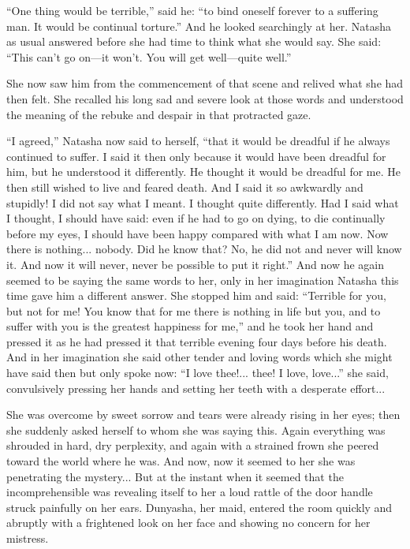 ``One thing would be terrible,'' said he: ``to bind oneself
forever to a suffering man. It would be continual torture.'' And
he looked searchingly at her. Natasha as usual answered before
she had time to think what she would say. She said: ``This can't
go on---it won't. You will get well---quite well.''

She now saw him from the commencement of that scene and relived
what she had then felt. She recalled his long sad and severe look
at those words and understood the meaning of the rebuke and
despair in that protracted gaze.

``I agreed,'' Natasha now said to herself, ``that it would be
dreadful if he always continued to suffer. I said it then only
because it would have been dreadful for him, but he understood it
differently. He thought it would be dreadful for me. He then
still wished to live and feared death.  And I said it so
awkwardly and stupidly! I did not say what I meant. I thought
quite differently. Had I said what I thought, I should have said:
even if he had to go on dying, to die continually before my eyes,
I should have been happy compared with what I am now. Now there
is nothing... nobody. Did he know that? No, he did not and never
will know it. And now it will never, never be possible to put it
right.'' And now he again seemed to be saying the same words to
her, only in her imagination Natasha this time gave him a
different answer. She stopped him and said: ``Terrible for you,
but not for me! You know that for me there is nothing in life but
you, and to suffer with you is the greatest happiness for me,''
and he took her hand and pressed it as he had pressed it that
terrible evening four days before his death. And in her
imagination she said other tender and loving words which she
might have said then but only spoke now: ``I love thee!... thee!
I love, love...''  she said, convulsively pressing her hands and
setting her teeth with a desperate effort...

She was overcome by sweet sorrow and tears were already rising in
her eyes; then she suddenly asked herself to whom she was saying
this. Again everything was shrouded in hard, dry perplexity, and
again with a strained frown she peered toward the world where he
was. And now, now it seemed to her she was penetrating the
mystery... But at the instant when it seemed that the
incomprehensible was revealing itself to her a loud rattle of the
door handle struck painfully on her ears. Dunyasha, her maid,
entered the room quickly and abruptly with a frightened look on
her face and showing no concern for her mistress.

